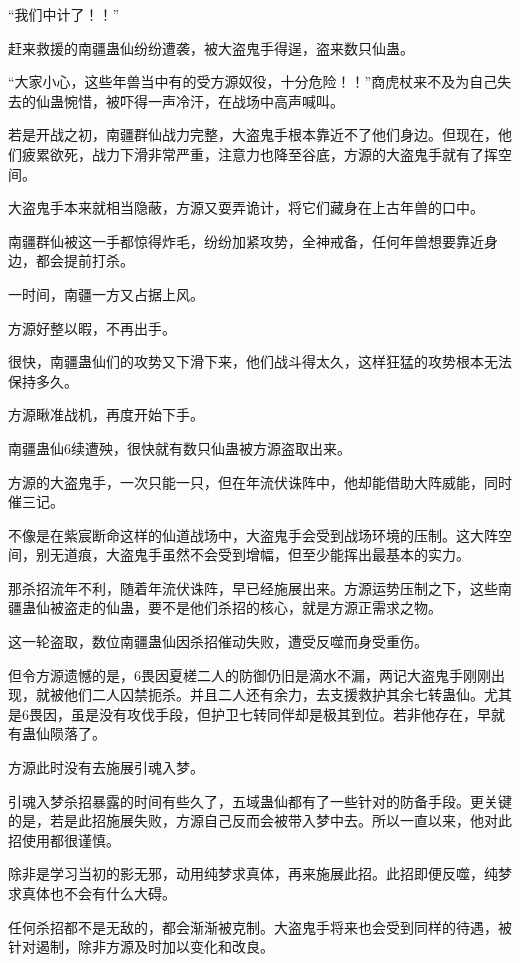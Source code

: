 \begin{this_body}
“我们中计了！！”

赶来救援的南疆蛊仙纷纷遭袭，被大盗鬼手得逞，盗来数只仙蛊。

“大家小心，这些年兽当中有的受方源奴役，十分危险！！”商虎杖来不及为自己失去的仙蛊惋惜，被吓得一声冷汗，在战场中高声喊叫。

若是开战之初，南疆群仙战力完整，大盗鬼手根本靠近不了他们身边。但现在，他们疲累欲死，战力下滑非常严重，注意力也降至谷底，方源的大盗鬼手就有了挥空间。

大盗鬼手本来就相当隐蔽，方源又耍弄诡计，将它们藏身在上古年兽的口中。

南疆群仙被这一手都惊得炸毛，纷纷加紧攻势，全神戒备，任何年兽想要靠近身边，都会提前打杀。

一时间，南疆一方又占据上风。

方源好整以暇，不再出手。

很快，南疆蛊仙们的攻势又下滑下来，他们战斗得太久，这样狂猛的攻势根本无法保持多久。

方源瞅准战机，再度开始下手。

南疆蛊仙6续遭殃，很快就有数只仙蛊被方源盗取出来。

方源的大盗鬼手，一次只能一只，但在年流伏诛阵中，他却能借助大阵威能，同时催三记。

不像是在紫宸断命这样的仙道战场中，大盗鬼手会受到战场环境的压制。这大阵空间，别无道痕，大盗鬼手虽然不会受到增幅，但至少能挥出最基本的实力。

那杀招流年不利，随着年流伏诛阵，早已经施展出来。方源运势压制之下，这些南疆蛊仙被盗走的仙蛊，要不是他们杀招的核心，就是方源正需求之物。

这一轮盗取，数位南疆蛊仙因杀招催动失败，遭受反噬而身受重伤。

但令方源遗憾的是，6畏因夏槎二人的防御仍旧是滴水不漏，两记大盗鬼手刚刚出现，就被他们二人囚禁扼杀。并且二人还有余力，去支援救护其余七转蛊仙。尤其是6畏因，虽是没有攻伐手段，但护卫七转同伴却是极其到位。若非他存在，早就有蛊仙陨落了。

方源此时没有去施展引魂入梦。

引魂入梦杀招暴露的时间有些久了，五域蛊仙都有了一些针对的防备手段。更关键的是，若是此招施展失败，方源自己反而会被带入梦中去。所以一直以来，他对此招使用都很谨慎。

除非是学习当初的影无邪，动用纯梦求真体，再来施展此招。此招即便反噬，纯梦求真体也不会有什么大碍。

任何杀招都不是无敌的，都会渐渐被克制。大盗鬼手将来也会受到同样的待遇，被针对遏制，除非方源及时加以变化和改良。


\end{this_body}
